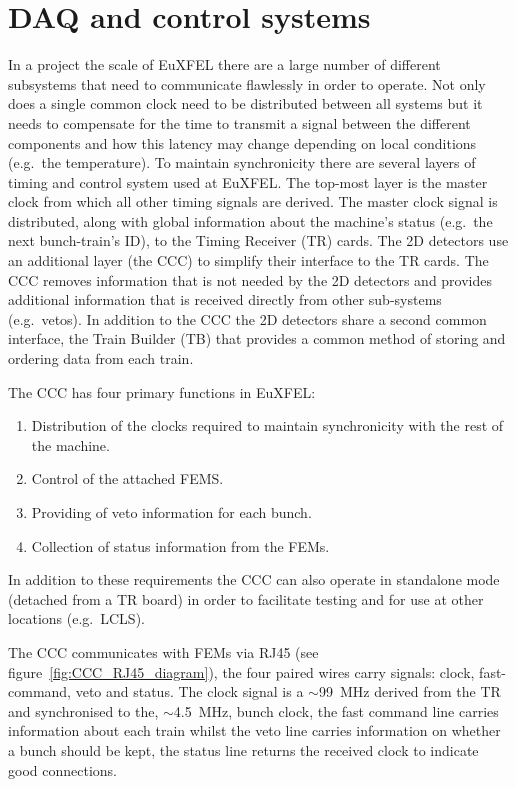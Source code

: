 \section{DAQ and control systems} %
\label{sec:daq_and_control_systems}
In a project the scale of EuXFEL there are a large number of different subsystems that need to communicate flawlessly in order to operate. Not only does a single common clock need to be distributed between all systems but it needs to compensate for the time to transmit a signal between the different components and how this latency may change depending on local conditions (e.g.\ the temperature). To maintain synchronicity there are several layers of timing and control system used at EuXFEL. The top-most layer is the master clock from which all other timing signals are derived. The master clock signal is distributed,  along with global information about the machine's status (e.g.\ the next bunch-train's ID), to the Timing Receiver (TR) cards. The 2D detectors use an additional layer (the CCC) to simplify their interface to the TR cards. The CCC removes information that is not needed by the 2D detectors and provides additional information that is received directly from other sub-systems (e.g.\ vetos). In addition to the CCC the 2D detectors share a second common interface, the Train Builder (TB) that provides a common method of storing and ordering data from each train.

The CCC has four primary functions in EuXFEL: 
\begin{enumerate}
  \item Distribution of the clocks required to maintain synchronicity with the rest of the machine.
  \item Control of the attached FEMS.
  \item Providing of veto information for each bunch.
  \item Collection of status information from the FEMs.
\end{enumerate}
In addition to these requirements the CCC can also operate in standalone mode (detached from a TR board) in order to facilitate testing and for use at other locations (e.g.\ LCLS). 

The CCC communicates with FEMs via RJ45 (see figure~\ref{fig:CCC_RJ45_diagram}), the four paired wires carry signals: clock, fast-command, veto and status. The clock signal is a \(\sim\)99~MHz derived from the TR and synchronised to the, \(\sim\)4.5~MHz, bunch clock, the fast command line carries information about each train whilst the veto line carries information on whether a bunch should be kept, the status line returns the received clock to indicate good connections.
